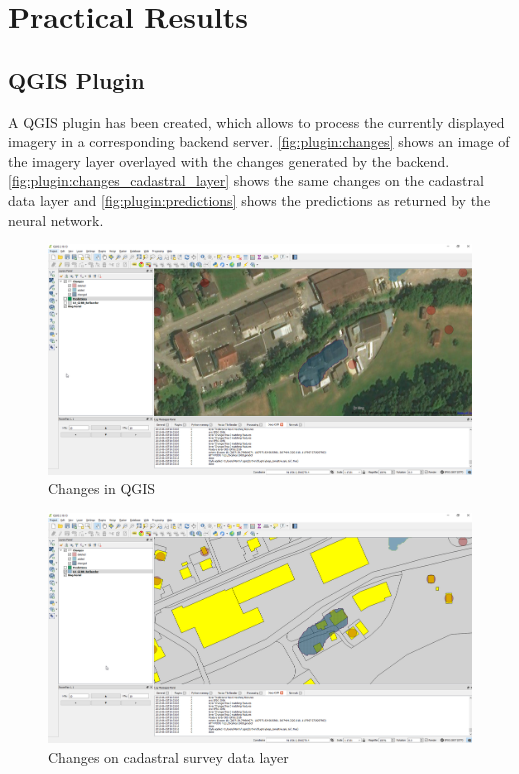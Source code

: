 
\chapter{Practical Results}\label{chp:practical_results}

\section{QGIS Plugin}
A QGIS plugin has been created, which allows to process the currently displayed imagery in a corresponding backend server. \autoref{fig:plugin:changes} shows an image of the imagery layer overlayed with the changes generated by the backend. \autoref{fig:plugin:changes_cadastral_layer} shows the same changes on the cadastral data layer and \autoref{fig:plugin:predictions} shows the predictions as returned by the neural network.

\begin{figure}[H]
    \centering
	\includegraphics[width=0.8\linewidth]{chapters/practical_results/images/qgis_changes_aerial.png}
	\caption{Changes in QGIS}
	\label{fig:plugin:changes}
\end{figure}

\begin{figure}[H]
    \centering
	\includegraphics[width=0.8\linewidth]{chapters/practical_results/images/qgis_changes.png}
	\caption{Changes on cadastral survey data layer}
	\label{fig:plugin:changes_cadastral_layer}
\end{figure}

